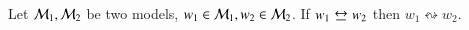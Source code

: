\begin{thm}\label{bisim}
Let $\mathcal{M}_1,\mathcal{M}_2$ be two models, $w_1 \in \mathcal{M}_1, w_2 \in
\mathcal{M}_2$. If $w_1 \bisim w_2$ then $w_1 \leftrightsquigarrow w_2$.
\end{thm}

%
%
%
%
%
%
%
%
%
%

